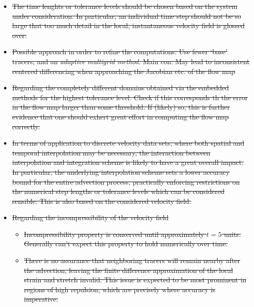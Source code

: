 \begin{framed}
\begin{itemize}
        \item \sout{The time lenghts or tolerance levels should be chosen based on the system under consideration.
            In particular, an individual time step should not be so large that too much detail in the local,
        instantaneous velocity field is glossed over.}
    \item \sout{Possible approach in order to refine the computations: Use fewer `base' tracers, and an \emph{adaptive multigrid method}. Main con: May lead to inconsistent centered differencing when approaching
        the Jacobian etc. of the flow map}
        \item \sout{Regarding the completely different domains obtained via the embedded methods for the highest tolerance level:
            Check if this corresponds th the error in the flow map larger than some threshold. If (likely) so, this is
        further evidence that one should exhert great effort in computing the flow map correctly.}
    \item \sout{In terms of application to discrete velocity data sets, where both spatial and temporal interpolation
                    may be necessary, the interaction between interpolation and integration scheme is likely to
                    have a great overall impact. In particular, the underlying interpolation scheme sets a lower accuracy
                    bound for the entire advection process, practically enforcing restrictions on the numerical step
                    lengths or tolerance levels which can be considered sensible. This is also based on the considered
                velocity field.}
            \item \sout{Regarding the incompressibility of the velocity field}
                    \begin{itemize}
                        \item \sout{Incompressibility property is conserved until approximately $t=5$ units. Generally can't expect
                            this property to hold numerically over time.}
                        \item \sout{There is no assurance that neighboring tracers will remain nearby after the advection,
                                leaving the finite difference approximation of the local strain and stretch invalid. This
                                issue is expected to be most prominent in regions of high repulsion, which are precisely
                            where accuracy is imperative.}
                    \end{itemize}

\end{itemize}
\end{framed}
